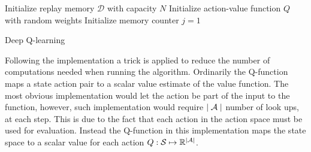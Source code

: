 \begin{algorithm}[H]
\SetAlgoLined
 Initialize replay memory $\mathcal{D}$ with capacity $N$\;
 Initialize action-value function $Q$ with random weights\;
 Initialize memory counter $j=1$\;
\caption{Deep Q-learning}
\label{alg:dqlearning}
\end{algorithm}

Following the implementation \textcite{mnih_playing_2013} a trick is applied to reduce the number of computations needed when running the algorithm. Ordinarily the Q-function maps a state action pair to a scalar value estimate of the value function. The most obvious implementation would let the action be part of the input to the function, however, such implementation would require $\mid \mathcal{A} \mid$ number of look ups, at each step. This is due to the fact that each action in the action space must be used for evaluation. Instead the Q-function in this implementation maps the state space to a scalar value for each action $Q: \mathcal{S} \mapsto \mathbb{R}^{\mid \mathcal{A} \mid}$. 

